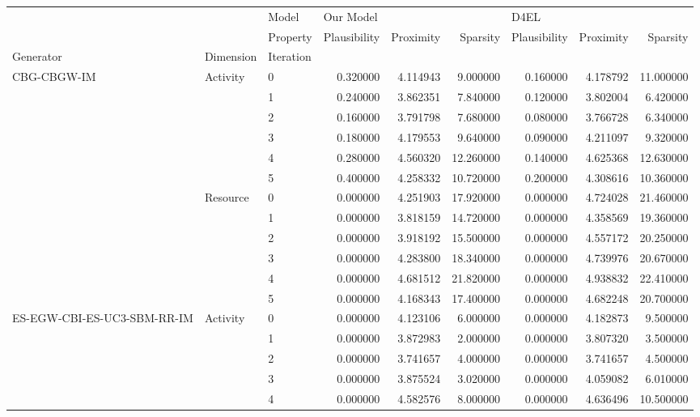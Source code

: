 \begin{tabular}{lllrrrrrr}
\toprule
 &  & Model & \multicolumn{3}{l}{Our Model} & \multicolumn{3}{l}{D4EL} \\
 &  & Property & Plausibility & Proximity & Sparsity & Plausibility & Proximity & Sparsity \\
Generator & Dimension & Iteration &  &  &  &  &  &  \\
\midrule
\multirow[t]{12}{*}{CBG-CBGW-IM} & \multirow[t]{6}{*}{Activity} & 0 & 0.320000 & 4.114943 & 9.000000 & 0.160000 & 4.178792 & 11.000000 \\
 &  & 1 & 0.240000 & 3.862351 & 7.840000 & 0.120000 & 3.802004 & 6.420000 \\
 &  & 2 & 0.160000 & 3.791798 & 7.680000 & 0.080000 & 3.766728 & 6.340000 \\
 &  & 3 & 0.180000 & 4.179553 & 9.640000 & 0.090000 & 4.211097 & 9.320000 \\
 &  & 4 & 0.280000 & 4.560320 & 12.260000 & 0.140000 & 4.625368 & 12.630000 \\
 &  & 5 & 0.400000 & 4.258332 & 10.720000 & 0.200000 & 4.308616 & 10.360000 \\
\cline{2-9}
 & \multirow[t]{6}{*}{Resource} & 0 & 0.000000 & 4.251903 & 17.920000 & 0.000000 & 4.724028 & 21.460000 \\
 &  & 1 & 0.000000 & 3.818159 & 14.720000 & 0.000000 & 4.358569 & 19.360000 \\
 &  & 2 & 0.000000 & 3.918192 & 15.500000 & 0.000000 & 4.557172 & 20.250000 \\
 &  & 3 & 0.000000 & 4.283800 & 18.340000 & 0.000000 & 4.739976 & 20.670000 \\
 &  & 4 & 0.000000 & 4.681512 & 21.820000 & 0.000000 & 4.938832 & 22.410000 \\
 &  & 5 & 0.000000 & 4.168343 & 17.400000 & 0.000000 & 4.682248 & 20.700000 \\
\cline{1-9} \cline{2-9}
\multirow[t]{12}{*}{ES-EGW-CBI-ES-UC3-SBM-RR-IM} & \multirow[t]{6}{*}{Activity} & 0 & 0.000000 & 4.123106 & 6.000000 & 0.000000 & 4.182873 & 9.500000 \\
 &  & 1 & 0.000000 & 3.872983 & 2.000000 & 0.000000 & 3.807320 & 3.500000 \\
 &  & 2 & 0.000000 & 3.741657 & 4.000000 & 0.000000 & 3.741657 & 4.500000 \\
 &  & 3 & 0.000000 & 3.875524 & 3.020000 & 0.000000 & 4.059082 & 6.010000 \\
 &  & 4 & 0.000000 & 4.582576 & 8.000000 & 0.000000 & 4.636496 & 10.500000 \\

\end{tabular}
